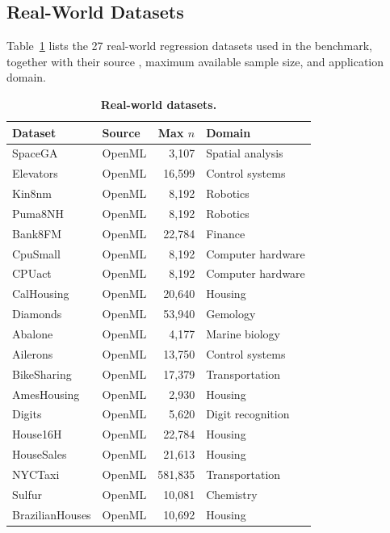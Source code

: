 \documentclass{article}
\begin{document}
\subsection{Real-World Datasets}
\label{app:real_datasets}

Table~\ref{tab:real_datasets} lists the 27 real-world regression datasets used
in the benchmark, together with their source \citep{vanschoren2013openml,sdss_dr18}, maximum available sample size,
and application domain.

\begin{table}[p]
\centering
\caption{\textbf{Real-world datasets.}}
\label{tab:real_datasets}
\small
\begin{tabular}{llrl}
\toprule
\textbf{Dataset} & \textbf{Source} & \textbf{Max $n$} & \textbf{Domain} \\
\midrule
SpaceGA          & OpenML &    3{,}107 & Spatial analysis \\
Elevators        & OpenML &   16{,}599 & Control systems \\
Kin8nm           & OpenML &    8{,}192 & Robotics \\
Puma8NH          & OpenML &    8{,}192 & Robotics \\
Bank8FM          & OpenML &   22{,}784 & Finance \\
CpuSmall         & OpenML &    8{,}192 & Computer hardware \\
CPUact           & OpenML &    8{,}192 & Computer hardware \\
CalHousing       & OpenML &   20{,}640 & Housing \\
Diamonds         & OpenML &   53{,}940 & Gemology \\
Abalone          & OpenML &    4{,}177 & Marine biology \\
Ailerons         & OpenML &   13{,}750 & Control systems \\
BikeSharing      & OpenML &   17{,}379 & Transportation \\
AmesHousing      & OpenML &    2{,}930 & Housing \\
Digits           & OpenML &    5{,}620 & Digit recognition \\
House16H         & OpenML &   22{,}784 & Housing \\
HouseSales       & OpenML &   21{,}613 & Housing \\
NYCTaxi          & OpenML &  581{,}835 & Transportation \\
Sulfur           & OpenML &   10{,}081 & Chemistry \\
BrazilianHouses  & OpenML &   10{,}692 & Housing \\

\end{tabular}
\end{table}
\end{document}
